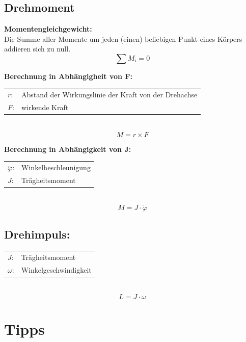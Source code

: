 \documentclass[10pt,a4paper]{article}
\renewcommand{\arraystretch}{1.5}
\begin{document}
\subsection{Drehmoment}
\textbf{Momentengleichgewicht:} \\
Die Summe aller Momente um jeden (einen) beliebigen Punkt eines Körpers addieren sich zu null.
$$
	\sum M_i = 0
$$

\textbf{Berechnung in Abhängigheit von F:} \\
\begin{tabularx}{\columnwidth}{lX}
	$r$: & Abstand der Wirkungslinie der Kraft von der Drehachse \\
	$F$: & wirkende Kraft
\end{tabularx} \\
$$
	M = r \times F
$$

\textbf{Berechnung in Abhängigkeit von J:} \\
\begin{tabularx}{\columnwidth}{lX}
	$\ddot \varphi$: & Winkelbeschleunigung \\
	$J$: & Trägheitsmoment
\end{tabularx} \\
$$
	M = J ⋅ \ddot \varphi
$$


\subsection{Drehimpuls:}
\begin{tabularx}{\columnwidth}{lX}
	$J$: & Trägheitsmoment \\
	$\omega$: & Winkelgeschwindigkeit
\end{tabularx} \\
$$
	L = J ⋅ \omega
$$

\renewcommand{\arraystretch}{1.5}
\section{Tipps}
\end{document}
